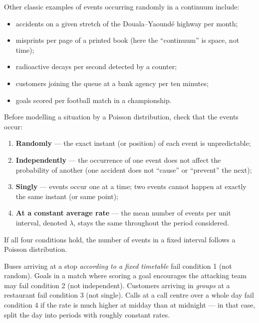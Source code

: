 \documentclass[11pt]{article}
\newcommand{\cle}[1]{{\popxbold\color{popdark}#1}}
\begin{document}
Other classic examples of events occurring randomly in a continuum include:
\begin{itemize}
\item accidents on a given stretch of the Douala--Yaoundé highway per month;
\item misprints per page of a printed book (here the ``continuum'' is space, not time);
\item radioactive decays per second detected by a counter;
\item customers joining the queue at a bank agency per ten minutes;
\item goals scored per football match in a championship.
\end{itemize}

\begin{methode}
Before modelling a situation by a Poisson distribution, check that the events occur:
\begin{enumerate}
\item \textbf{Randomly} --- the exact instant (or position) of each event is unpredictable;
\item \textbf{Independently} --- the occurrence of one event does not affect the probability of another (one accident does not ``cause'' or ``prevent'' the next);
\item \textbf{Singly} --- events occur one at a time; two events cannot happen at exactly the same instant (or same point);
\item \textbf{At a constant average rate} --- the mean number of events per \cle{unit interval}, denoted $\lambda$, stays the same throughout the period considered.
\end{enumerate}
If all four conditions hold, the number of events in a fixed interval follows a Poisson distribution.
\end{methode}

\begin{attention}
Buses arriving at a stop \emph{according to a fixed timetable} fail condition 1 (not random). Goals in a match where scoring a goal encourages the attacking team may fail condition 2 (not independent). Customers arriving in \emph{groups} at a restaurant fail condition 3 (not single). Calls at a call centre over a whole day fail condition 4 if the rate is much higher at midday than at midnight --- in that case, split the day into periods with roughly constant rates.
\end{attention}
\end{document}
